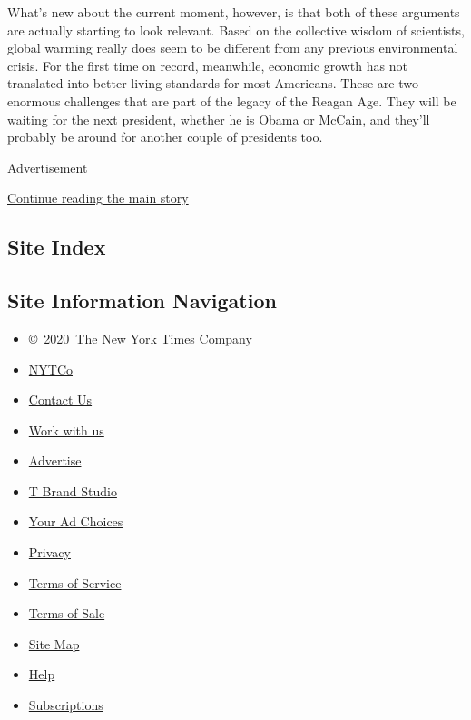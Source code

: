 What's new about the current moment, however, is that both of these
arguments are actually starting to look relevant. Based on the
collective wisdom of scientists, global warming really does seem to be
different from any previous environmental crisis. For the first time on
record, meanwhile, economic growth has not translated into better living
standards for most Americans. These are two enormous challenges that are
part of the legacy of the Reagan Age. They will be waiting for the next
president, whether he is Obama or McCain, and they'll probably be around
for another couple of presidents too.

Advertisement

\protect\hyperlink{after-bottom}{Continue reading the main story}

\hypertarget{site-index}{%
\subsection{Site Index}\label{site-index}}

\hypertarget{site-information-navigation}{%
\subsection{Site Information
Navigation}\label{site-information-navigation}}

\begin{itemize}
\tightlist
\item
  \href{https://help.nytimes.com/hc/en-us/articles/115014792127-Copyright-notice}{©~2020~The
  New York Times Company}
\end{itemize}

\begin{itemize}
\tightlist
\item
  \href{https://www.nytco.com/}{NYTCo}
\item
  \href{https://help.nytimes.com/hc/en-us/articles/115015385887-Contact-Us}{Contact
  Us}
\item
  \href{https://www.nytco.com/careers/}{Work with us}
\item
  \href{https://nytmediakit.com/}{Advertise}
\item
  \href{http://www.tbrandstudio.com/}{T Brand Studio}
\item
  \href{https://www.nytimes.com/privacy/cookie-policy\#how-do-i-manage-trackers}{Your
  Ad Choices}
\item
  \href{https://www.nytimes.com/privacy}{Privacy}
\item
  \href{https://help.nytimes.com/hc/en-us/articles/115014893428-Terms-of-service}{Terms
  of Service}
\item
  \href{https://help.nytimes.com/hc/en-us/articles/115014893968-Terms-of-sale}{Terms
  of Sale}
\item
  \href{https://spiderbites.nytimes.com}{Site Map}
\item
  \href{https://help.nytimes.com/hc/en-us}{Help}
\item
  \href{https://www.nytimes.com/subscription?campaignId=37WXW}{Subscriptions}
\end{itemize}
